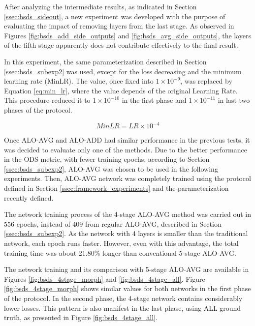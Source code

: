 After analyzing the intermediate results, as indicated in Section \ref{ssec:bsds_sideout}, a new experiment was developed with the purpose of evaluating the impact of removing layers from the last stage.
As observed in Figures \ref{fig:bsds_add_side_outputs} and \ref{fig:bsds_avg_side_outputs}, the layers of the fifth stage apparently does not contribute effectively to the final result.

In this experiment, the same parameterization described in Section \ref{ssec:bsds_subexp2} was used, except for the loss decreasing and the minimum learning rate (MinLR).
The value, once fixed into $1 \times 10^{-9}$, was replaced by Equation \ref{eq:min_lr}, where the value depends of the original Learning Rate.
This procedure reduced it to $1 \times 10^{-10}$ in the first phase and $1 \times 10^{-11}$ in last two phases of the protocol.

\begin{equation}
  MinLR = LR \times 10^{-4}
  \label{eq:min_lr}
\end{equation}

Once ALO-AVG and ALO-ADD had similar performance in the previous tests, it was decided to evaluate only one of the methods.
Due to the better performance in the ODS metric, with fewer training epochs, according to Section \ref{ssec:bsds_subexp2}, ALO-AVG was chosen to be used in the following experiments.
Then, ALO-AVG network was completely trained using the protocol defined in Section \ref{ssec:framework_experiments} and the parameterization recently defined.

The network training process of the 4-stage ALO-AVG method was carried out in 556 epochs, instead of 409 from regular ALO-AVG, described in Section \ref{ssec:bsds_subexp2}.
As the network with 4 layers is smaller than the traditional network, each epoch runs faster.
However, even with this advantage, the total training time was about 21.80\% longer than conventional 5-stage ALO-AVG.

The network training and its comparison with 5-stage ALO-AVG are available in Figures \ref{fig:bsds_4stage_morph} and \ref{fig:bsds_4stage_all}.
Figure \ref{fig:bsds_4stage_morph} shows similar values for both networks in the first phase of the protocol.
In the second phase, the 4-stage network contains considerably lower losses.
This pattern is also manifest in the last phase, using ALL ground truth, as presented in Figure \ref{fig:bsds_4stage_all}.


